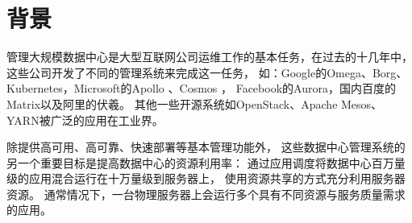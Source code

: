 
%

\section{背景}

管理大规模数据中心是大型互联网公司运维工作的基本任务，在过去的十几年中，
这些公司开发了不同的管理系统来完成这一任务，
如：Google的Omega\cite{Schwarzkopf_omega_2013}、Borg\cite{borg:2015}、
Kubernetes\cite{Kubernetes}，Microsoft的Apollo \cite{Apollo}、Cosmos \cite{Cosmos}，
Facebook的Aurora\cite{Aurora}，国内百度的Matrix以及阿里的伏羲\cite{Fuxi}。
其他一些开源系统如OpenStack\cite{OpenStack}、Apache Mesos\cite{Hindman:2011:Mesos}、
YARN\cite{YARN}被广泛的应用在工业界。

除提供高可用、高可靠、快速部署等基本管理功能外，
这些数据中心管理系统的另一个重要目标是提高数据中心的资源利用率：
通过应用调度将数据中心百万量级的应用混合运行在十万量级到服务器上，
使用资源共享的方式充分利用服务器资源。
通常情况下，一台物理服务器上会运行多个具有不同资源与服务质量需求的应用。

